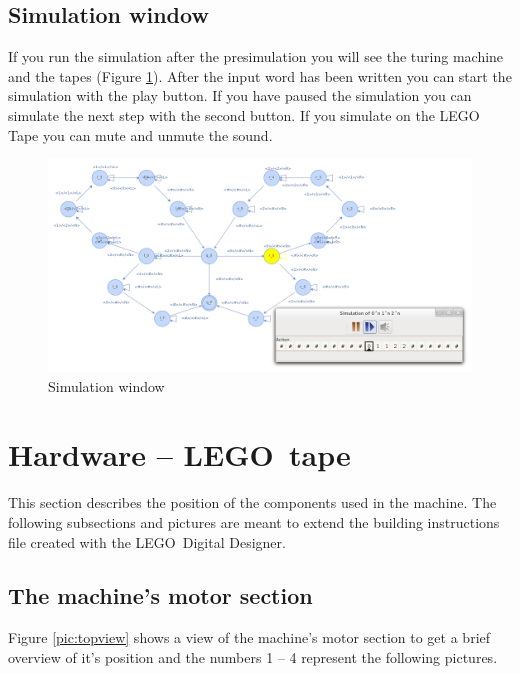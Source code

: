 \documentclass[%
  a4paper,%
  11pt,%
  blue,%
  hyperref	%
  ]{tubsartcl}
\begin{document}
\subsection{Simulation window}
If you run the simulation after the presimulation you will see the turing machine and the tapes (Figure \ref{pic:simulation_window}). After the input word has been written you can start the simulation with the play button. If you have paused the simulation you can simulate the next step with the second button. If you simulate on the LEGO\textregistered\, Tape you can mute and unmute the sound.
\begin{figure}[!htb]
\begin{center}
\includegraphics[scale=0.35]{graphics_gui/simulation_window.png}
\end{center}
\caption{Simulation window}
\label{pic:simulation_window}
\end{figure}

\clearpage

\section{Hardware -- LEGO\textregistered\, tape}

This section describes the position of the components used in the machine. The following subsections and pictures are meant to extend the building instructions file created with the LEGO\textregistered\, Digital Designer.

\subsection{The machine's motor section}

Figure \ref{pic:topview} shows a view of the machine's motor section to get a brief overview of it's position and the numbers 1 -- 4 represent the following pictures.
\end{document}
